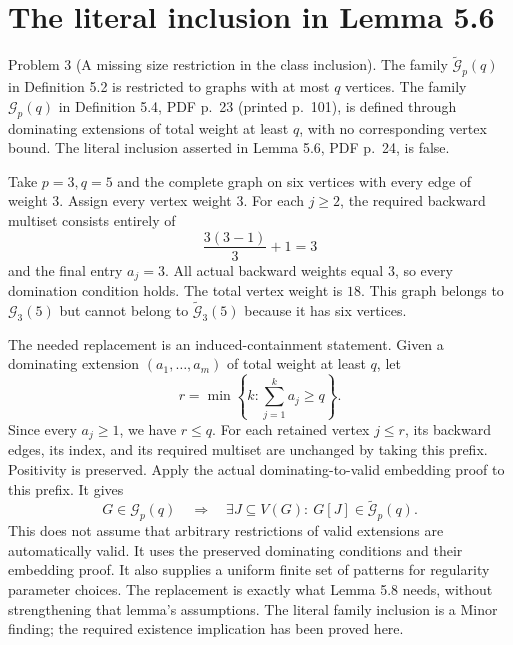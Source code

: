 \documentclass[10pt]{article}
\begin{document}
\section*{The literal inclusion in Lemma 5.6}
Problem 3 (A missing size restriction in the class inclusion).  The family \(\widetilde{\mathcal G}_p(q)\) in Definition 5.2 is restricted to graphs with at most \(q\) vertices. The family \(\mathcal G_p(q)\) in Definition 5.4, PDF p. 23 (printed p. 101), is defined through dominating extensions of total weight at least \(q\), with no corresponding vertex bound. The literal inclusion asserted in Lemma 5.6, PDF p. 24, is false.\par
Take \(p=3,q=5\) and the complete graph on six vertices with every edge of weight \(3\). Assign every vertex weight \(3\). For each \(j\geq2\), the required backward multiset consists entirely of \[\frac{3(3-1)}3+1=3\] and the final entry \(a_j=3\). All actual backward weights equal \(3\), so every domination condition holds. The total vertex weight is \(18\). This graph belongs to \(\mathcal G_3(5)\) but cannot belong to \(\widetilde{\mathcal G}_3(5)\) because it has six vertices.\par
The needed replacement is an induced-containment statement. Given a dominating extension \((a_1,\ldots,a_m)\) of total weight at least \(q\), let \[r=\min\left\{k:\sum_{j=1}^{k}a_j\geq q\right\}.\] Since every \(a_j\geq1\), we have \(r\leq q\). For each retained vertex \(j\leq r\), its backward edges, its index, and its required multiset are unchanged by taking this prefix. Positivity is preserved. Apply the actual dominating-to-valid embedding proof to this prefix. It gives \[G\in\mathcal G_p(q)\quad\Longrightarrow\quad
 \exists J\subseteq V(G):\
 G[J]\in\widetilde{\mathcal G}_p(q).\] This does not assume that arbitrary restrictions of valid extensions are automatically valid. It uses the preserved dominating conditions and their embedding proof. It also supplies a uniform finite set of patterns for regularity parameter choices. The replacement is exactly what Lemma 5.8 needs, without strengthening that lemma’s assumptions. The literal family inclusion is a Minor finding; the required existence implication has been proved here.\par
\end{document}
